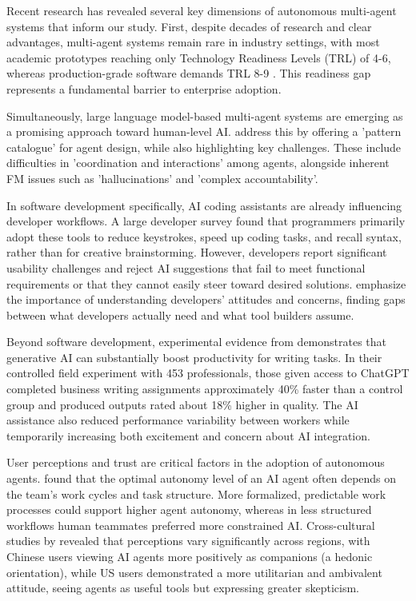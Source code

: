 \documentclass{article}
\begin{document}
Recent research has revealed several key dimensions of autonomous
multi-agent systems that inform our study. First, despite decades of
research and clear advantages, multi-agent systems remain rare in
industry settings, with most academic prototypes reaching only
Technology Readiness Levels (TRL) of 4-6, whereas production-grade
software demands TRL 8-9 \citep{Wrona2023}. This readiness gap
represents a fundamental barrier to enterprise adoption.

Simultaneously, large language model-based multi-agent systems are
emerging as a promising approach toward human-level AI. \cite{liu2024} address this by offering a 'pattern catalogue' for agent design, while also highlighting key challenges. These include difficulties in 'coordination and interactions' among agents, alongside inherent FM issues such as 'hallucinations' and 'complex accountability'.

In software development specifically, AI coding assistants are already
influencing developer workflows. A large developer survey \cite{ICSESurvey2024} found that programmers primarily adopt these tools to reduce keystrokes, speed up coding tasks, and recall syntax, rather than for creative brainstorming. However, developers report significant usability challenges and reject AI suggestions that fail to meet functional requirements or that they cannot easily steer toward desired solutions. \cite{KhemkaHouck2024} emphasize the importance of understanding developers' attitudes and concerns, finding gaps between what developers actually need and what tool builders assume.

Beyond software development, experimental evidence from \cite{NoyZhang2023} demonstrates that generative AI can substantially boost
productivity for writing tasks. In their controlled field experiment
with 453 professionals, those given access to ChatGPT completed business
writing assignments approximately 40\% faster than a control group and
produced outputs rated about 18\% higher in quality. The AI assistance
also reduced performance variability between workers while temporarily
increasing both excitement and concern about AI integration.

User perceptions and trust are critical factors in the adoption of
autonomous agents. \cite{Hauptman2022} found that the optimal
autonomy level of an AI agent often depends on the team's work cycles
and task structure. More formalized, predictable work processes could
support higher agent autonomy, whereas in less structured workflows
human teammates preferred more constrained AI. Cross-cultural studies by
\cite{LiuCHI2024} revealed that perceptions vary significantly across
regions, with Chinese users viewing AI agents more positively as
companions (a hedonic orientation), while US users demonstrated a more
utilitarian and ambivalent attitude, seeing agents as useful tools but
expressing greater skepticism.
\end{document}

